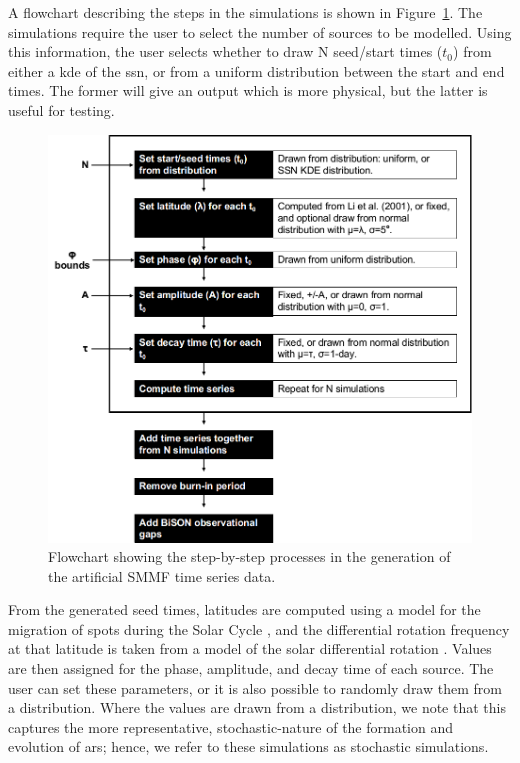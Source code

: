 A flowchart describing the steps in the simulations is shown in Figure~\ref{fig:flowchart}. The simulations require the user to select the number of sources to be modelled. Using this information, the user selects whether to draw N seed/start times ($t_0$) from either a \gls{kde} of the \gls{ssn}, or from a uniform distribution between the start and end times. The former will give an output which is more physical, but the latter is useful for testing.


\begin{figure}[ht!]
	\centering
	\includegraphics[width=0.85\columnwidth]{flow_chart_2.png}
	\caption{Flowchart showing the step-by-step processes in the generation of the artificial SMMF time series data.}
	\label{fig:flowchart}
\end{figure}


From the generated seed times, latitudes are computed using a model for the migration of spots during the Solar Cycle \citep{li_latitude_2001}, and the differential rotation frequency at that latitude is taken from a model of the solar differential rotation \citep{snodgrass_magnetic_1983}. Values are then assigned for the phase, amplitude, and decay time of each source. The user can set these parameters, or it is also possible to randomly draw them from a distribution. Where the values are drawn from a distribution, we note that this captures the more representative, stochastic-nature of the formation and evolution of \glspl{ar}; hence, we refer to these simulations as stochastic simulations. 

